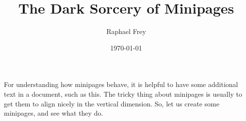 \documentclass{article}
\title{The Dark Sorcery of Minipages}
\author{Raphael Frey}
\date{\today}
\begin{document}

\maketitle


For understanding how minipages behave, it  is helpful to have some additional
text in a document, such as  this. The tricky thing about minipages is usually
to get them to align nicely in  the vertical dimension. So, let us create some
minipages, and see what they do.
\end{document}
